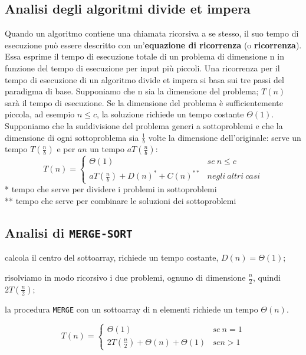 \documentclass[11pt,a4paper]{article}
\begin{document}
\subsection{Analisi degli algoritmi divide et impera}
Quando un algoritmo contiene una chiamata ricorsiva a se stesso, il suo tempo di esecuzione può essere
descritto con un’\textbf{equazione di ricorrenza} (o \textbf{ricorrenza}). Essa esprime il tempo di esecuzione totale di un
problema di dimensione n in funzione del tempo di esecuzione per input più piccoli.
Una ricorrenza per il tempo di esecuzione di un algoritmo divide et impera si basa sui tre passi del paradigma
di base. Supponiamo che n sia la dimensione del problema; $T(n)$ sarà il tempo di esecuzione. Se la dimensione
del problema è sufficientemente piccola, ad esempio $n \leq c$, la soluzione richiede un tempo costante $\Theta(1)$.
Supponiamo che la suddivisione del problema generi a sottoproblemi e che la dimensione di ogni
sottoproblema sia $\frac{1}{b}$ volte la dimensione dell’originale: serve un tempo $T(\frac{n}{b})$ e per $an$ un tempo $aT(\frac{n}{b})$:
\[T(n)= \begin{cases}
          \Theta(1) & se\ n \leq c\\
          aT(\frac{n}{b})+D(n)^*+C(n)^{**} & negli\ altri\ casi
        \end{cases}
\]
* tempo che serve per dividere i problemi in sottoproblemi\\
** tempo che serve per combinare le soluzioni dei sottoproblemi

\subsection{Analisi di \texttt{MERGE-SORT}}
\begin{description}[leftmargin=*]
  \item[Divide] calcola il centro del sottoarray, richiede un tempo costante, $D(n) = \Theta(1)$;
  \item[Impera] risolviamo in modo ricorsivo i due problemi, ognuno di dimensione $\frac{n}{2}$, quindi $2T(\frac{n}{2})$;
  \item[Combina] la procedura \texttt{MERGE} con un sottoarray di n elementi richiede un tempo $\Theta(n)$.
\end{description}
\[T(n)= \begin{cases}
          \Theta(1) & se\ n=1\\
          2T(\frac{n}{2})+\Theta(n)+\Theta(1) & se n > 1
        \end{cases}
\]
\end{document}
